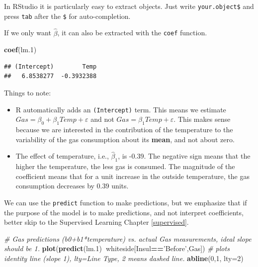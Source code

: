 \documentclass[]{book}
\newenvironment{Shaded}{\begin{snugshade}}{\end{snugshade}}
\newcommand{\CommentTok}[1]{\textcolor[rgb]{0.56,0.35,0.01}{\textit{#1}}}
\newcommand{\DataTypeTok}[1]{\textcolor[rgb]{0.13,0.29,0.53}{#1}}
\newcommand{\DecValTok}[1]{\textcolor[rgb]{0.00,0.00,0.81}{#1}}
\newcommand{\FloatTok}[1]{\textcolor[rgb]{0.00,0.00,0.81}{#1}}
\newcommand{\KeywordTok}[1]{\textcolor[rgb]{0.13,0.29,0.53}{\textbf{#1}}}
\newcommand{\NormalTok}[1]{#1}
\newcommand{\OperatorTok}[1]{\textcolor[rgb]{0.81,0.36,0.00}{\textbf{#1}}}
\newcommand{\StringTok}[1]{\textcolor[rgb]{0.31,0.60,0.02}{#1}}
\theoremstyle{definition}
\theoremstyle{definition}
\theoremstyle{definition}
\theoremstyle{remark}
\begin{document}
In RStudio it is particularly easy to extract objects. Just write \texttt{your.object\$} and press \texttt{tab} after the \texttt{\$} for auto-completion.

If we only want \(\hat \beta\), it can also be extracted with the \texttt{coef} function.

\begin{Shaded}
\begin{Highlighting}[]
\KeywordTok{coef}\NormalTok{(lm}\FloatTok{.1}\NormalTok{)}
\end{Highlighting}
\end{Shaded}

\begin{verbatim}
## (Intercept)        Temp 
##   6.8538277  -0.3932388
\end{verbatim}

Things to note:

\begin{itemize}
\item
  R automatically adds an \texttt{(Intercept)} term.
  This means we estimate \(Gas=\beta_0 + \beta_1 Temp + \varepsilon\) and not \(Gas=\beta_1 Temp + \varepsilon\).
  This makes sense because we are interested in the contribution of the temperature to the variability of the gas consumption about its \textbf{mean}, and not about zero.
\item
  The effect of temperature, i.e., \(\hat \beta_1\), is -0.39.
  The negative sign means that the higher the temperature, the less gas is consumed.
  The magnitude of the coefficient means that for a unit increase in the outside temperature, the gas consumption decreases by 0.39 units.
\end{itemize}

We can use the \texttt{predict} function to make predictions, but we emphasize that if the purpose of the model is to make predictions, and not interpret coefficients, better skip to the Supervised Learning Chapter \ref{supervised}.

\begin{Shaded}
\begin{Highlighting}[]
\CommentTok{# Gas predictions (b0+b1*temperature) vs. actual Gas measurements, ideal slope should be 1.}
\KeywordTok{plot}\NormalTok{(}\KeywordTok{predict}\NormalTok{(lm}\FloatTok{.1}\NormalTok{)}\OperatorTok{~}\NormalTok{whiteside[Insul}\OperatorTok{==}\StringTok{'Before'}\NormalTok{,Gas])}
\CommentTok{# plots identity line (slope 1), lty=Line Type, 2 means dashed line.}
\KeywordTok{abline}\NormalTok{(}\DecValTok{0}\NormalTok{,}\DecValTok{1}\NormalTok{, }\DataTypeTok{lty=}\DecValTok{2}\NormalTok{)}
\end{Highlighting}
\end{Shaded}
\end{document}
